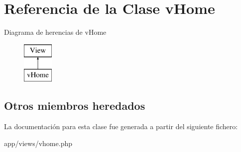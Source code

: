 \hypertarget{classv_home}{}\section{Referencia de la Clase v\+Home}
\label{classv_home}
Diagrama de herencias de v\+Home\begin{figure}[H]
\begin{center}
\leavevmode
\includegraphics[height=2.000000cm]{classv_home}
\end{center}
\end{figure}
\subsection*{Otros miembros heredados}


La documentación para esta clase fue generada a partir del siguiente fichero\+:\begin{DoxyCompactItemize}
\item 
app/views/vhome.\+php\end{DoxyCompactItemize}

